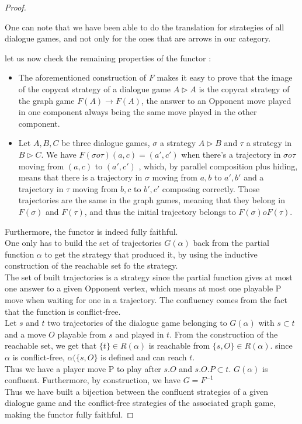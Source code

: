 \documentclass[a4paper,UKenglish]{lipics}
\begin{document}
\begin{proof}
\begin{itemize}
One can note that we have been able to do the translation for strategies of all dialogue games, and not only for the ones that are arrows in our category.\\

\end{itemize}
let us now check the remaining properties of the functor : 

\begin{itemize}
\item The aforementioned construction of $F$ makes it easy to prove that the image of the copycat strategy of a dialogue game $A\rhd A$ is the copycat strategy of the graph game $F(A)\rightarrow F(A)$, the answer to an Opponent move played in one component always being the same move played in the other component.\\

\item Let $A, B, C$ be three dialogue games, $\sigma$ a strategy $ A \rhd B$ and $\tau$ a strategy in $B \rhd C$. We have $F(\sigma o \tau)( a,c) = (a', c')$ when there's a trajectory in $\sigma o \tau$ moving from $(a,c)$ to $(a',c')$ , which, by parallel composition plus hiding, means that there is a trajectory in $\sigma$ moving from $a,b$ to $a',b'$ and a trajectory in $\tau$ moving from $b,c$ to $b',c'$ composing correctly. Those trajectories are the same in the graph games, meaning that they belong in $F(\sigma)$ and $F(\tau)$, and thus the initial trajectory belongs to $F(\sigma) o F(\tau)$. \\

\end{itemize}
Furthermore, the functor is indeed fully faithful.\\
 One only has to build the set of trajectories $G(\alpha)$ back from the partial function $\alpha$ to get the strategy that produced it, by using the inductive construction of the reachable set fo the strategy.\\
 The set of built trajectories is a strategy since the partial function gives at most one answer to a given Opponent vertex, which means at most one playable P  move when waiting for one in a trajectory. The confluency comes from the fact that the function is conflict-free. \\Let $s$ and $t$ two trajectories of the dialogue game belonging to $G(\alpha)$  with $s \subset t$ and a move $O$ playable from $s$ and played in $t$. From the construction of the reachable set, we get that $\{t\} \in R(\alpha)$ is reachable from $\{s,O\} \in R(\alpha)$. since $\alpha$ is conflict-free,  $\alpha(\{s,O\}$ is defined and can reach $t$. \\Thus we have a player move P to play after $s.O$ and  $s.O.P \subset t$. $G(\alpha)$ is confluent. Furthermore, by construction, we have $G=F^{-1}$  \\



Thus we have built a bijection between the confluent strategies of a given dialogue game and the conflict-free strategies of the associated graph game, making the functor fully faithful.


\end{proof}
\end{document}
